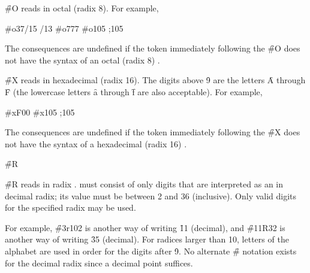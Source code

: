 \endsubsubsection%



\f{\#O} reads  in octal (radix 8).
For example, 

\code
 #o37/15 /13
 #o777 
 #o105  ;105\ssse
\endcode

The consequences are undefined if the token immediately following
the \f{\#O} does not have the syntax of an octal (\ie radix 8) .

\endsubsubsection%



\f{\#X} reads  in hexadecimal (radix 16).
The digits above \f{9} are the letters \f{A} through \f{F} (the lowercase
letters \f{a} through \f{f} are also acceptable).  For example,

\code
 #xF00              
 #x105  ;105\ssss
\endcode

The consequences are undefined if the token immediately following
the \f{\#X} does not have the syntax of a hexadecimal (\ie radix 16) .

\endsubsubsection%


\f{\#R}
                                                             
\f{\#R} reads  in radix .
 must consist of only digits
that are interpreted as an 
in decimal radix; its value must be between 2 and 36 (inclusive).
Only valid digits
for the specified radix may be used.

For example, \f{\#3r102} is another way of writing \f{11} (decimal), 
and \f{\#11R32}
is another way of writing \f{35} (decimal).  
For radices larger than 10, letters of
the alphabet are used in order for the digits after \f{9}.
No alternate \f{\#} notation exists for the decimal radix since a
decimal point suffices.

